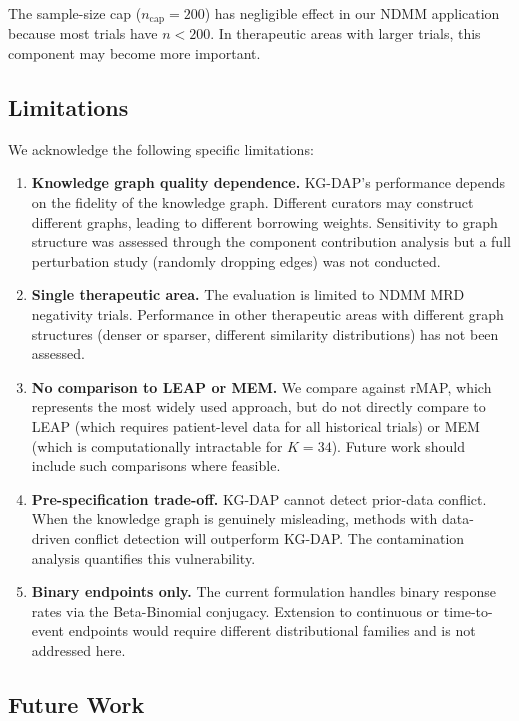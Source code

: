 \documentclass[12pt]{article}
\begin{document}
The sample-size cap ($n_{\mathrm{cap}} = 200$) has negligible effect in our NDMM application because most trials have $n < 200$. In therapeutic areas with larger trials, this component may become more important.

\subsection{Limitations}

We acknowledge the following specific limitations:

\begin{enumerate}
\item \textbf{Knowledge graph quality dependence.} KG-DAP's performance depends on the fidelity of the knowledge graph. Different curators may construct different graphs, leading to different borrowing weights. Sensitivity to graph structure was assessed through the component contribution analysis but a full perturbation study (randomly dropping edges) was not conducted.

\item \textbf{Single therapeutic area.} The evaluation is limited to NDMM MRD negativity trials. Performance in other therapeutic areas with different graph structures (denser or sparser, different similarity distributions) has not been assessed.

\item \textbf{No comparison to LEAP or MEM.} We compare against rMAP, which represents the most widely used approach, but do not directly compare to LEAP (which requires patient-level data for all historical trials) or MEM (which is computationally intractable for $K = 34$). Future work should include such comparisons where feasible.

\item \textbf{Pre-specification trade-off.} KG-DAP cannot detect prior-data conflict. When the knowledge graph is genuinely misleading, methods with data-driven conflict detection will outperform KG-DAP. The contamination analysis quantifies this vulnerability.

\item \textbf{Binary endpoints only.} The current formulation handles binary response rates via the Beta-Binomial conjugacy. Extension to continuous or time-to-event endpoints would require different distributional families and is not addressed here.
\end{enumerate}

\subsection{Future Work}
\end{document}
